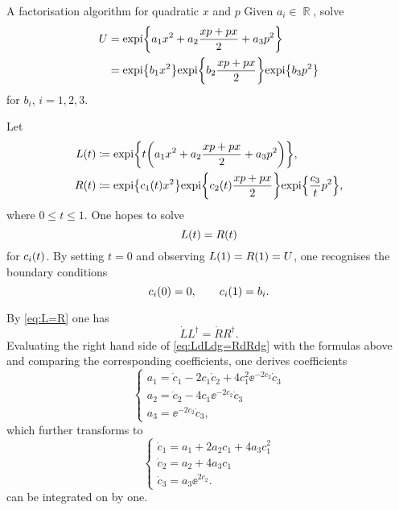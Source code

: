 \begin{nameddef}{A factorisation algorithm for quadratic $x$ and $p$}
Given $a_i\in\BbbR$, solve
\begin{align}
	U &= {\operatorname{expi}}\mathopen{}\left\{a_1 x^2 + a_2 \frac{xp+px}{2} + a_3 p^2\right\}\mathclose{}
	\nonumber \\
	&= {\operatorname{expi}}\mathopen{}\left\{b_1 x^2\right\}\mathclose{} {\operatorname{expi}}\mathopen{}\left\{b_2\frac{xp+px}{2}\right\}\mathclose{}
		{\operatorname{expi}}\mathopen{}\left\{b_3 p^2\right\}\mathclose{}
		\label{eq:to-be-factorised}
\end{align}
for $b_i$, $i = 1, 2, 3$.

Let
\begin{align}
{L}\mathopen{}\left(t\right)\mathclose{} &\coloneqq
{\operatorname{expi}}\mathopen{}\left\{t{\left(a_1 x^2 + a_2 \frac{xp+px}{2} + a_3 p^2\right)}\right\}\mathclose{}, \\
{R}\mathopen{}\left(t\right)\mathclose{} &\coloneqq
{\operatorname{expi}}\mathopen{}\left\{{c_1}\mathopen{}\left(t\right)\mathclose{} x^2\right\}\mathclose{} {\operatorname{expi}}\mathopen{}\left\{{c_2}\mathopen{}\left(t\right)\mathclose{}\frac{xp+px}{2}\right\}\mathclose{} 
{\operatorname{expi}}\mathopen{}\left\{\frac{c_3}{t} p^2\right\}\mathclose{},
\end{align}
where $0 \le t \le 1$.
One hopes to solve
\begin{equation}
	{L}\mathopen{}\left(t\right)\mathclose{} = {R}\mathopen{}\left(t\right)\mathclose{}
	\label{eq:L=R}
\end{equation}
for ${c_i}\mathopen{}\left(t\right)\mathclose{}$. By setting $t = 0$ and observing ${L}\mathopen{}\left(1\right)\mathclose{} = 
{R}\mathopen{}\left(1\right)\mathclose{} = U$, one recognises the boundary conditions
\begin{equation}
{c_i}\mathopen{}\left(0\right)\mathclose{} = 0,\qquad {c_i}\mathopen{}\left(1\right)\mathclose{} = b_i.
\end{equation}

By \eqref{eq:L=R} one has
\begin{equation}
	\dot{L}L^\dagger = \dot{R}R^\dagger.
	\label{eq:LdLdg=RdRdg}
\end{equation}
Evaluating the right hand side of \eqref{eq:LdLdg=RdRdg} with the formulas 
above and comparing the corresponding coefficients, one derives
coefficients
\begin{equation}
	\left\{\begin{array}{l}
		a_1 = \dot c_1 - 2 c_1 \dot{c}_2 + 4 c_1^2 \ee^{-2 c_2}\dot{c}_3 \\
		a_2 = \dot{c}_2 - 4 c_1 \ee^{-2 c_2} \dot{c}_3 \\
		a_3 = \ee^{-2 c_2} \dot{c}_3,
	\end{array}\right.
\end{equation}
which further transforms to
\begin{equation}
	\left\{\begin{array}{l}
		\dot{c}_1 = a_1 + 2 a_2 c_1 + 4 a_3 c_1^2 \\
		\dot{c}_2 = a_2 + 4 a_3 c_1 \\
		\dot{c}_3 = a_3 \ee^{2 c_2}.
	\end{array}\right.
	\label{eq:one-by-one}
\end{equation}
 can be integrated on by one.
\end{nameddef} %